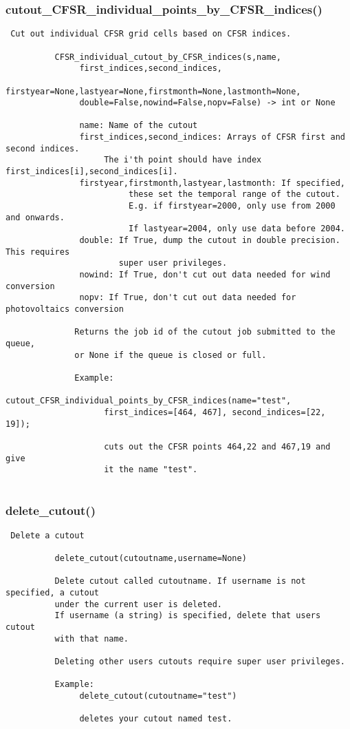 \subsubsection{cutout\_CFSR\_individual\_points\_by\_CFSR\_indices()}


\begin{verbatim}
 Cut out individual CFSR grid cells based on CFSR indices.

          CFSR_individual_cutout_by_CFSR_indices(s,name,
               first_indices,second_indices,
               firstyear=None,lastyear=None,firstmonth=None,lastmonth=None,
               double=False,nowind=False,nopv=False) -> int or None

               name: Name of the cutout
               first_indices,second_indices: Arrays of CFSR first and second indices.
                    The i'th point should have index first_indices[i],second_indices[i].
               firstyear,firstmonth,lastyear,lastmonth: If specified,
                         these set the temporal range of the cutout.
                         E.g. if firstyear=2000, only use from 2000 and onwards.
                         If lastyear=2004, only use data before 2004.
               double: If True, dump the cutout in double precision. This requires
                       super user privileges.
               nowind: If True, don't cut out data needed for wind conversion
               nopv: If True, don't cut out data needed for photovoltaics conversion

              Returns the job id of the cutout job submitted to the queue,
              or None if the queue is closed or full.  
              
              Example:
               cutout_CFSR_individual_points_by_CFSR_indices(name="test",
                    first_indices=[464, 467], second_indices=[22, 19]);

                    cuts out the CFSR points 464,22 and 467,19 and give
                    it the name "test".
              
\end{verbatim}
\subsubsection{delete\_cutout()}


\begin{verbatim}
 Delete a cutout
          
          delete_cutout(cutoutname,username=None)

          Delete cutout called cutoutname. If username is not specified, a cutout
          under the current user is deleted.
          If username (a string) is specified, delete that users cutout
          with that name.

          Deleting other users cutouts require super user privileges.
          
          Example:
               delete_cutout(cutoutname="test")

               deletes your cutout named test.
          
          
\end{verbatim}
